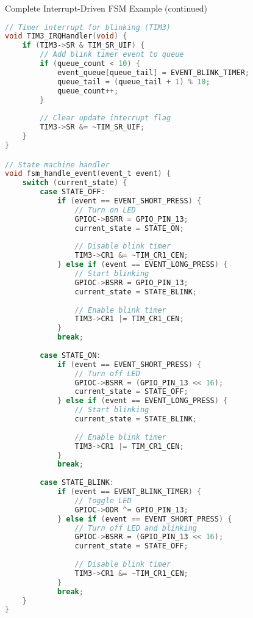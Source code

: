 \begin{example2}{Complete Interrupt-Driven FSM Example (continued)}
\begin{lstlisting}[language=C, style=basesmol]
// Timer interrupt for blinking (TIM3)
void TIM3_IRQHandler(void) {
    if (TIM3->SR & TIM_SR_UIF) {
        // Add blink timer event to queue
        if (queue_count < 10) {
            event_queue[queue_tail] = EVENT_BLINK_TIMER;
            queue_tail = (queue_tail + 1) % 10;
            queue_count++;
        }
        
        // Clear update interrupt flag
        TIM3->SR &= ~TIM_SR_UIF;
    }
}

// State machine handler
void fsm_handle_event(event_t event) {
    switch (current_state) {
        case STATE_OFF:
            if (event == EVENT_SHORT_PRESS) {
                // Turn on LED
                GPIOC->BSRR = GPIO_PIN_13;
                current_state = STATE_ON;
                
                // Disable blink timer
                TIM3->CR1 &= ~TIM_CR1_CEN;
            } else if (event == EVENT_LONG_PRESS) {
                // Start blinking
                GPIOC->BSRR = GPIO_PIN_13;
                current_state = STATE_BLINK;
                
                // Enable blink timer
                TIM3->CR1 |= TIM_CR1_CEN;
            }
            break;
            
        case STATE_ON:
            if (event == EVENT_SHORT_PRESS) {
                // Turn off LED
                GPIOC->BSRR = (GPIO_PIN_13 << 16);
                current_state = STATE_OFF;
            } else if (event == EVENT_LONG_PRESS) {
                // Start blinking
                current_state = STATE_BLINK;
                
                // Enable blink timer
                TIM3->CR1 |= TIM_CR1_CEN;
            }
            break;
            
        case STATE_BLINK:
            if (event == EVENT_BLINK_TIMER) {
                // Toggle LED
                GPIOC->ODR ^= GPIO_PIN_13;
            } else if (event == EVENT_SHORT_PRESS) {
                // Turn off LED and blinking
                GPIOC->BSRR = (GPIO_PIN_13 << 16);
                current_state = STATE_OFF;
                
                // Disable blink timer
                TIM3->CR1 &= ~TIM_CR1_CEN;
            }
            break;
    }
}

\end{lstlisting}
\end{example2}

